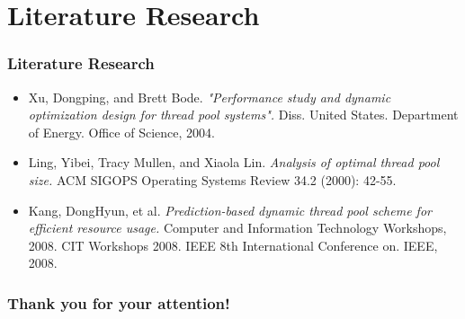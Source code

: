 \documentclass{beamer}
\begin{document}
\section{Literature Research}
    \begin{frame}
        \frametitle{Literature Research}
        \begin{itemize}
            \item Xu, Dongping, and Brett Bode. \emph{"Performance study and dynamic optimization design for thread pool systems".} Diss. United States. Department of Energy. Office of Science, 2004.
            \item Ling, Yibei, Tracy Mullen, and Xiaola Lin. \emph{Analysis of optimal thread pool size.} ACM SIGOPS Operating Systems Review 34.2 (2000): 42-55.
            \item Kang, DongHyun, et al. \emph{Prediction-based dynamic thread pool scheme for efficient resource usage.} Computer and Information Technology Workshops, 2008. CIT Workshops 2008. IEEE 8th International Conference on. IEEE, 2008.
        \end{itemize}
    \end{frame}

    \begin{frame}
        \frametitle{Thank you for your attention!}
    \end{frame}
\end{document}
